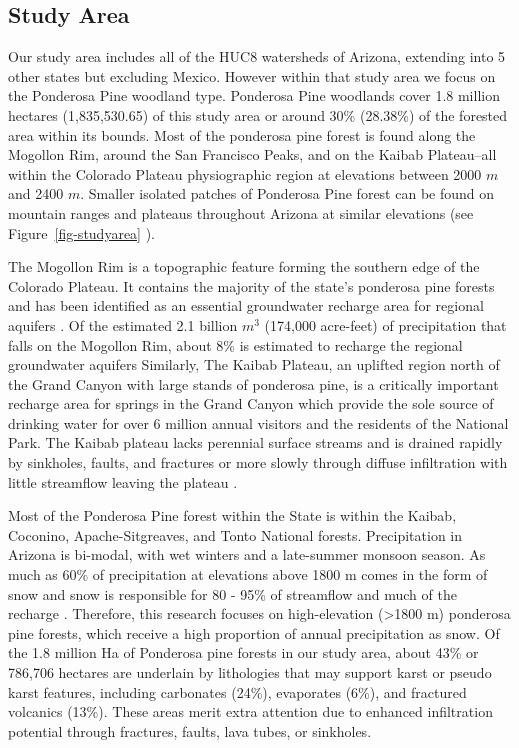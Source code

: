\documentclass[
  number,
  preprint,
  3p,
  onecolumn]{elsarticle}
\begin{document}
\subsection{Study Area}\label{study-area}

Our study area includes all of the HUC8 watersheds of Arizona, extending
into 5 other states but excluding Mexico. However within that study area
we focus on the Ponderosa Pine woodland type. Ponderosa Pine woodlands
cover 1.8 million hectares (1,835,530.65) of this study area or around
30\% (28.38\%) of the forested area within its bounds. Most of the
ponderosa pine forest is found along the Mogollon Rim, around the San
Francisco Peaks, and on the Kaibab Plateau--all within the Colorado
Plateau physiographic region at elevations between 2000 \(m\) and 2400
\(m\). Smaller isolated patches of Ponderosa Pine forest can be found on
mountain ranges and plateaus throughout Arizona at similar elevations
(see Figure~\ref{fig-studyarea} ).

The Mogollon Rim is a topographic feature forming the southern edge of
the Colorado Plateau. It contains the majority of the state's ponderosa
pine forests and has been identified as an essential groundwater
recharge area for regional aquifers \citep{parker2005}. Of the estimated
2.1 billion \(m^3\) (174,000 acre-feet) of precipitation that falls on
the Mogollon Rim, about 8\% is estimated to recharge the regional
groundwater aquifers\citep{parker2005} Similarly, The Kaibab Plateau, an
uplifted region north of the Grand Canyon with large stands of ponderosa
pine, is a critically important recharge area for springs in the Grand
Canyon which provide the sole source of drinking water for over 6
million annual visitors and the residents of the National
Park\citep{tobin2018}. The Kaibab plateau lacks perennial surface
streams and is drained rapidly by sinkholes, faults, and fractures or
more slowly through diffuse infiltration with little streamflow leaving
the plateau \citep{jones2018, huntoon1974}.

Most of the Ponderosa Pine forest within the State is within the Kaibab,
Coconino, Apache-Sitgreaves, and Tonto National forests. Precipitation
in Arizona is bi-modal, with wet winters and a late-summer monsoon
season. As much as 60\% of precipitation at elevations above 1800 m
comes in the form of snow and snow is responsible for 80 - 95\% of
streamflow and much of the recharge
\citep{baker2013, eastoe2023, earman2006}. Therefore, this research
focuses on high-elevation (\textgreater1800 m) ponderosa pine forests,
which receive a high proportion of annual precipitation as snow. Of the
1.8 million Ha of Ponderosa pine forests in our study area, about 43\%
or 786,706 hectares are underlain by lithologies that may support karst
or pseudo karst features, including carbonates (24\%), evaporates (6\%),
and fractured volcanics (13\%). These areas merit extra attention due to
enhanced infiltration potential through fractures, faults, lava tubes,
or sinkholes.
\end{document}

